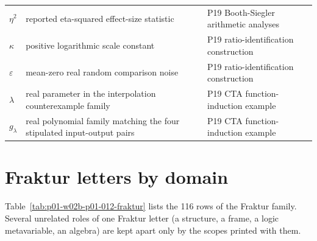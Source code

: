\begin{longtable}{@{}p{}p{}p{}@{}}
\(\eta^2\) & reported eta-squared effect-size statistic & P19 Booth-\allowbreak{}Siegler arithmetic analyses \\
\(\kappa\) & positive logarithmic scale constant & P19 ratio-\allowbreak{}identification construction \\
\(\varepsilon\) & mean-zero real random comparison noise & P19 ratio-\allowbreak{}identification construction \\
\(\lambda\) & real parameter in the interpolation counterexample family & P19 CTA function-\allowbreak{}induction example \\
\(g_\lambda\) & real polynomial family matching the four stipulated input-output pairs & P19 CTA function-\allowbreak{}induction example \\
\end{longtable}
\endgroup

\section{Fraktur letters by domain}
\label{sec:p01-w02b-p01-012-fraktur}

Table~\ref{tab:p01-w02b-p01-012-fraktur} lists the 116 rows
of the Fraktur family.  Several unrelated roles of one Fraktur letter (a
structure, a frame, a logic metavariable, an algebra) are kept apart only
by the scopes printed with them.

